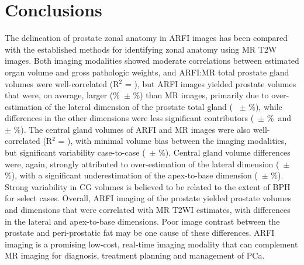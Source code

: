 \section{Conclusions}
The delineation of prostate zonal anatomy in ARFI images has been compared with
the established methods for identifying zonal anatomy using MR T2W images.
Both imaging modalities showed moderate correlations between estimated organ
volume and gross pathologic weights, and ARFI:MR total prostate gland volumes
were well-correlated (R$^2$ = \MRarfiVolTotalRsq), but ARFI images yielded
prostate volumes that were, on average, larger (\MRarfiVolTotalMeanDiff\%~$\pm$
\MRarfiVolTotalStdDiff\%) than MR images, primarily due to over-estimation of
the lateral dimension of the prostate total gland (\ARFImrTotalLatLatMeanPct~
$\pm$ \ARFImrTotalLatLatStdPct\%), while differences in the other dimensions
were less significant contributors (\ARFImrTotalAntPostMeanPct~$\pm$
\ARFImrTotalAntPostStdPct\%~and \ARFImrTotalApexBaseMeanPct~$\pm$
\ARFImrTotalApexBaseStdPct\%).  The central gland volumes of ARFI and MR images
were also well-correlated (R$^2$ = \MRarfiVolCentralRsq), with minimal volume
bias between the imaging modalities, but significant variability case-to-case
(\MRarfiVolCentralMeanDiff~$\pm$ \MRarfiVolCentralStdDiff\%).  Central gland
volume differences were, again, strongly attributed to over-estimation of the
lateral dimension (\ARFImrCentralLatLatMeanPct~$\pm$
\ARFImrCentralLatLatStdPct\%), with a significant underestimation of the
apex-to-base dimension (\ARFImrCentralAntPostMeanPct~$\pm$
\ARFImrCentralAntPostStdPct\%).  Strong variability in CG volumes is believed
to be related to the extent of BPH for select cases.  Overall, ARFI imaging of
the prostate yielded prostate volumes and dimensions that were correlated with
MR T2WI estimates, with differences in the lateral and apex-to-base dimensions.
Poor image contrast between the prostate and peri-prostatic fat may be one
cause of these differences.  ARFI imaging is a promising low-cost, real-time
imaging modality that can complement MR imaging for diagnosis, treatment
planning and management of PCa.
